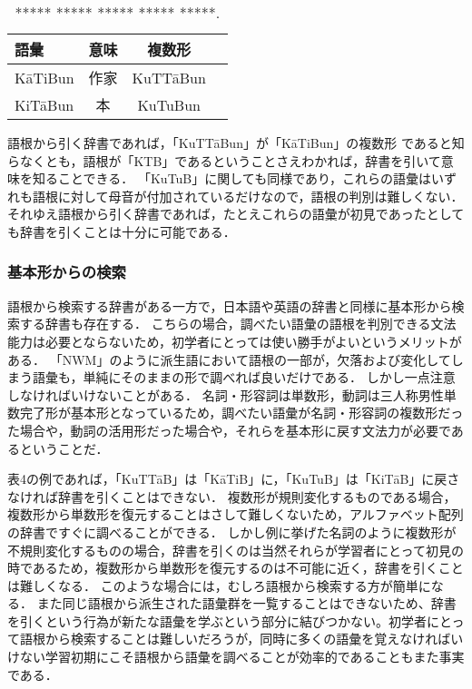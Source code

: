 \documentclass[technicalreport]{ieicej}
\begin{document}
\begin{table}[ht]
\begin{center}
\begin{tabular}{l|ccc}
   語彙 & 意味 & 複数形\\
  \hline
 KāTiBun & 作家 & KuTTāBun \\
  KiTāBun & 本 & KuTuBun\\
\hline
\end{tabular}
\caption{***** ***** ***** ***** *****.}
\label{table:alignment}
\end{center}
\end{table}

語根から引く辞書であれば，「KuTTāBun」が「KāTiBun」の複数形 であると知らなくとも，語根が「KTB」であるということさえわかれば，辞書を引いて意味を知ることできる．
「KuTuB」に関しても同様であり，これらの語彙はいずれも語根に対して母音が付加されているだけなので，語根の判別は難しくない．
それゆえ語根から引く辞書であれば，たとえこれらの語彙が初見であったとしても辞書を引くことは十分に可能である．

\subsubsection{基本形からの検索}
語根から検索する辞書がある一方で，日本語や英語の辞書と同様に基本形から検索する辞書も存在する．
こちらの場合，調べたい語彙の語根を判別できる文法能力は必要とならないため，初学者にとっては使い勝手がよいというメリットがある．
「NWM」のように派生語において語根の一部が，欠落および変化してしまう語彙も，単純にそのままの形で調べれば良いだけである．
しかし一点注意しなければいけないことがある．
名詞・形容詞は単数形，動詞は三人称男性単数完了形が基本形となっているため，調べたい語彙が名詞・形容詞の複数形だった場合や，動詞の活用形だった場合や，それらを基本形に戻す文法力が必要であるということだ．

表4の例であれば，「KuTTāB」は「KāTiB」に，「KuTuB」は「KiTāB」に戻さなければ辞書を引くことはできない．
複数形が規則変化するものである場合，複数形から単数形を復元することはさして難しくないため，アルファベット配列の辞書ですぐに調べることができる．
しかし例に挙げた名詞のように複数形が不規則変化するものの場合，辞書を引くのは当然それらが学習者にとって初見の時であるため，複数形から単数形を復元するのは不可能に近く，辞書を引くことは難しくなる．
このような場合には，むしろ語根から検索する方が簡単になる．
また同じ語根から派生された語彙群を一覧することはできないため、辞書を引くという行為が新たな語彙を学ぶという部分に結びつかない。初学者にとって語根から検索することは難しいだろうが，同時に多くの語彙を覚えなければいけない学習初期にこそ語根から語彙を調べることが効率的であることもまた事実である．
\end{document}
